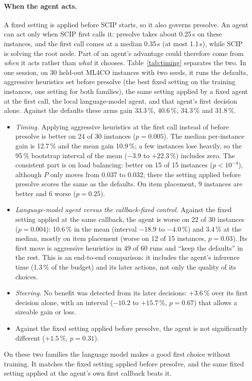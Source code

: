 \documentclass[11pt]{article}
\begin{document}
\paragraph{When the agent acts.} A fixed setting is applied before SCIP starts, so it also governs presolve. An agent
can act only when SCIP first calls it: presolve takes about 0.25\,s on these instances, and the first call comes at a
median 0.35\,s (at most 1.1\,s), while SCIP is solving the root node. Part of an agent's advantage could therefore come
from \emph{when} it acts rather than \emph{what} it chooses. Table~\ref{tab:timing} separates the two. In one session,
on 30 held-out ML4CO instances with two seeds, it runs the defaults, aggressive heuristics set before presolve (the
best fixed setting on the training instances, one setting for both families),
the same setting applied by a fixed agent at the first call, the local language-model agent, and that agent's first
decision alone. Against the defaults these arms gain 33.3\,\%, 40.6\,\%, 34.3\,\% and 31.8\,\%.
\begin{itemize}
\item \emph{Timing.} Applying aggressive heuristics at the first call instead of before presolve is better on 24 of 30
  instances ($p=0.005$). The median per-instance gain is 12.7\,\% and the mean gain 10.9\,\%; a few instances lose
  heavily, so the 95\,\% bootstrap interval of the mean ($-3.9$ to $+22.3\,\%$) includes zero. The consistent part is on
  load balancing: better on 15 of 15 instances ($p<10^{-4}$), although $P$ only moves from 0.037 to 0.032; there the
  setting applied before presolve scores the same as the defaults. On item placement, 9 instances are better and 6
  worse ($p=0.25$).
\item \emph{Language-model agent versus the callback-fixed control.} Against the fixed setting applied at the same
  callback, the agent is worse on 22 of 30 instances ($p=0.004$): 10.6\,\% in the mean (interval $-18.9$ to $-4.0\,\%$) and 3.4\,\% at the median,
  mostly on item placement (worse on 12 of 15 instances, $p=0.03$). Its
  first move is aggressive heuristics in 49 of 60 runs and ``keep the defaults'' in the rest. This is an end-to-end
  comparison: it includes the agent's inference time (1.3\,\% of the budget) and its later actions, not only the
  quality of its choices.
\item \emph{Steering.} No benefit was detected from its later decisions: $+3.6\,\%$ over its first decision alone,
  with an interval ($-10.2$ to $+15.7\,\%$, $p=0.67$) that allows a sizeable gain or loss.
\item Against the fixed setting applied before presolve, the agent is not significantly different ($+1.5\,\%$,
  $p=0.31$).
\end{itemize}
On these two families the language model makes a good first choice without training. It matches the fixed setting
applied before presolve, and the same fixed setting applied at the agent's own first callback beats it.

\end{document}
